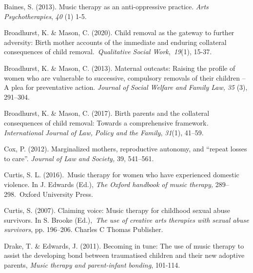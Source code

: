 \documentclass[authordate, empirical, issue]{jote-new-article}
\begin{document}
Baines, S. (2013). Music therapy as an anti-oppressive practice. \emph{Arts Psychotherapies}, \emph{40} (1) 1-5.







Broadhurst, K. \& Mason, C. (2020). Child removal as the gateway to further adversity: Birth mother accounts of the immediate and enduring collateral consequences of child removal. \emph{Qualitative Social Work}, \emph{19}(1), 15-37.







Broadhurst, K. \& Mason, C. (2013). Maternal outcasts: Raising the profile of women who are vulnerable to successive, compulsory removals of their children -- A plea for preventative action. \emph{Journal of Social Welfare and Family Law,} \emph{35 }(3), 291--304.







Broadhurst, K. \& Mason, C. (2017). Birth parents and the collateral consequences of child removal: Towards a comprehensive framework\emph{. International Journal of Law, Policy and the Family},\emph{ 31}(1), 41--59.







Cox, P. (2012). Marginalized mothers, reproductive autonomy, and “repeat losses to care”. \emph{Journal of Law and Society,} 39, 541--561.







Curtis, S. L. (2016). Music therapy for women who have experienced domestic violence. In J. Edwards (Ed.), \emph{The Oxford handbook of music therapy,} 289--298. Oxford University Press.







Curtis, S. (2007). Claiming voice: Music therapy for childhood sexual abuse survivors. In S. Brooke (Ed.), \emph{The use of creative arts therapies with sexual abuse survivors}, pp. 196--206. Charles C Thomas Publisher.







Drake, T. \& Edwards, J. (2011). Becoming in tune: The use of music therapy to assist the developing bond between traumatised children and their new adoptive parents, \emph{Music therapy and parent-infant bonding}, 101-114.
\end{document}
